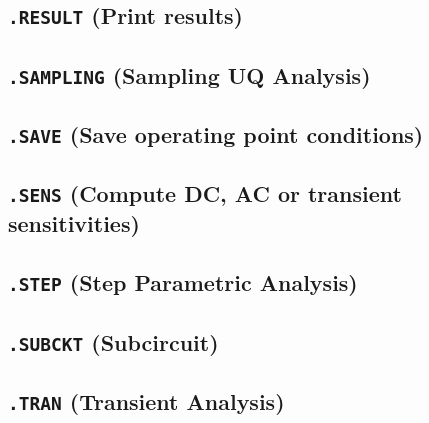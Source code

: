 \newpage
\subsection{\texttt{.RESULT} (Print results)}\label{.RESULT}


\newpage
\subsection{\texttt{.SAMPLING} (Sampling UQ Analysis)}\label{.SAMPLING}


\newpage
\subsection{\texttt{.SAVE} (Save operating point conditions)}


\newpage
\subsection{\texttt{.SENS} (Compute DC, AC or transient sensitivities)}
\label{SensitivityAnalysis}


\newpage
\subsection{\texttt{.STEP} (Step Parametric Analysis)}\label{.STEP}


\newpage
\subsection{\texttt{.SUBCKT} (Subcircuit)}
\label{SubcircuitDefinition}


\newpage
\subsection{\texttt{.TRAN} (Transient Analysis)}


